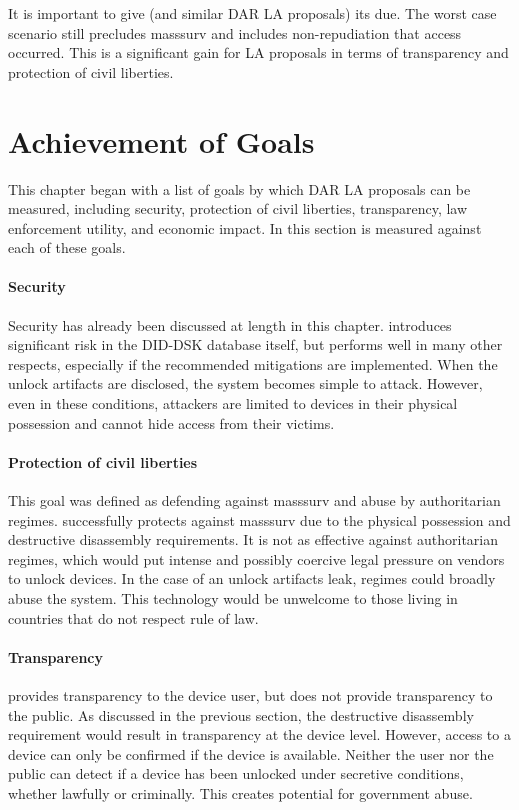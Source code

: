 \documentclass[manuscript,screen,review]{acmart}
\begin{document}
It is important to give \ldawmsr (and similar \ac{DAR} \ac{LA} proposals) its due. The worst case scenario still
precludes \ac{masssurv} and includes non-repudiation that access occurred. This is a significant gain for \ac{LA}
proposals in terms of transparency and protection of civil liberties.


\section{Achievement of Goals}

This chapter began with a list of goals by which \ac{DAR} \ac{LA} proposals can be measured, including security,
protection of civil liberties, transparency, law enforcement utility, and economic impact. In this section \ldawmsr is
measured against each of these goals.

\paragraph*{Security} Security has already been discussed at length in this chapter. \ldawmsr introduces significant
risk in the DID-DSK database itself, but performs well in many other respects, especially if the recommended mitigations
are implemented. When the unlock artifacts are disclosed, the system becomes simple to attack. However, even in these
conditions, attackers are limited to devices in their physical possession and cannot hide access from their victims.

\paragraph*{Protection of civil liberties} This goal was defined as defending against \ac{masssurv} and abuse by
authoritarian regimes. \ldawmsr successfully protects against \ac{masssurv} due to the physical possession and
destructive disassembly requirements. It is not as effective against authoritarian regimes, which would put intense and
possibly coercive legal pressure on vendors to unlock devices. In the case of an unlock artifacts leak, regimes could
broadly abuse the system. This technology would be unwelcome to those living in countries that do not respect rule of
law.

\paragraph*{Transparency} \ldawmsr provides transparency to the device user, but does not provide transparency to the
public. As discussed in the previous section, the destructive disassembly requirement would result in transparency at
the device level. However, access to a device can only be confirmed if the device is available. Neither the user nor the
public can detect if a device has been unlocked under secretive conditions, whether lawfully or criminally. This creates
potential for government abuse.
\end{document}
